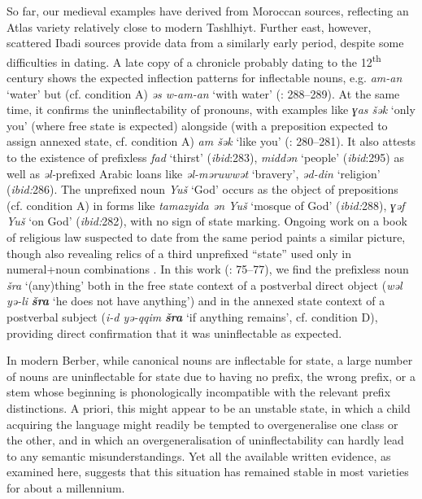 \documentclass[output=paper]{langscibook}
\begin{document}
\begin{styleStandarduser}
So far, our medieval examples have derived from Moroccan sources, reflecting an Atlas variety relatively close to modern Tashlhiyt. Further east, however, scattered Ibadi sources provide data from a similarly early period, despite some difficulties in dating. A late copy of a chronicle probably dating to the 12\textsuperscript{th} century shows the expected inflection patterns for inflectable nouns, e.g. \textit{am-an} ‘water’ but (cf. condition A) \textit{əs w-am-an} ‘with water’ (\citealt{Lewicki1934}: 288–289). At the same time, it confirms the uninflectability of pronouns, with examples like \textit{ɣas šək} ‘only you’ (where free state is expected) alongside (with a preposition expected to assign annexed state, cf. condition A) \textit{am šək} ‘like you’ (\citealt{Lewicki1934}: 280–281). It also attests to the existence of prefixless \textit{fad} ‘thirst’ (\textit{ibid}:283), \textit{middən} ‘people’ (\textit{ibid}:295) as well as \textit{əl-}prefixed Arabic loans like \textit{əl-məruwwət} ‘bravery’, \textit{əd-din} ‘religion’ (\textit{ibid:}286). The unprefixed noun \textit{Yuš} ‘God’ occurs as the object of prepositions (cf. condition A) in forms like \textit{tamazyida ən Yuš} ‘mosque of God’ (\textit{ibid:}288), \textit{ɣəf Yuš} ‘on God’ (\textit{ibid:}282), with no sign of state marking. Ongoing work on a book of religious law suspected to date from the same period paints a similar picture, though also revealing relics of a third unprefixed “state” used only in numeral+noun combinations \citep{Brugnatelli2011}. In this work (\citealt{Calassanti-Motylinski1905}: 75–77), we find the prefixless noun \textit{šra} ‘(any)thing’ both in the free state context of a postverbal direct object (\textit{wəl yə-li} \textbf{\textit{šra}} ‘he does not have anything’) and in the annexed state context of a postverbal subject (\textit{i-d yə-qqim} \textbf{\textit{šra}} ‘if anything remains’, cf. condition D), providing direct confirmation that it was uninflectable as expected.
\end{styleStandarduser}

\begin{styleStandarduser}
In modern Berber, while canonical nouns are inflectable for state, a large number of nouns are uninflectable for state due to having no prefix, the wrong prefix, or a stem whose beginning is phonologically incompatible with the relevant prefix distinctions. A priori, this might appear to be an unstable state, in which a child acquiring the language might readily be tempted to overgeneralise one class or the other, and in which an overgeneralisation of uninflectability can hardly lead to any semantic misunderstandings. Yet all the available written evidence, as examined here, suggests that this situation has remained stable in most varieties for about a millennium.
\end{styleStandarduser}
\end{document}
